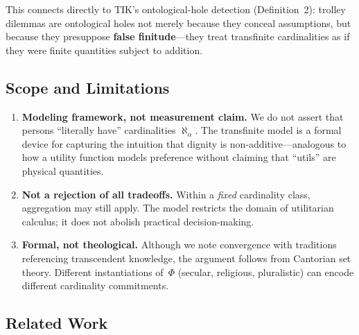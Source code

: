 \documentclass[11pt]{article}
\begin{document}
\begin{center}
\end{center}

This connects directly to TIK's ontological-hole detection (Definition~2):
trolley dilemmas are ontological holes not merely because they conceal
assumptions, but because they presuppose \textbf{false finitude}---they treat
transfinite cardinalities as if they were finite quantities subject to
addition.

\subsection{Scope and Limitations}

\begin{enumerate}
    \item \textbf{Modeling framework, not measurement claim.}
          We do not assert that persons ``literally have'' cardinalities
          $\aleph_\alpha$. The transfinite model is a formal device for
          capturing the intuition that dignity is non-additive---analogous to
          how a utility function models preference without claiming that
          ``utils'' are physical quantities.
    \item \textbf{Not a rejection of all tradeoffs.}
          Within a \emph{fixed} cardinality class, aggregation may still
          apply. The model restricts the domain of utilitarian calculus; it
          does not abolish practical decision-making.
    \item \textbf{Formal, not theological.}
          Although we note convergence with traditions referencing
          transcendent knowledge, the argument follows from Cantorian set
          theory. Different instantiations of~$\Phi$ (secular, religious,
          pluralistic) can encode different cardinality commitments.
\end{enumerate}

\subsection{Related Work}
\end{document}
